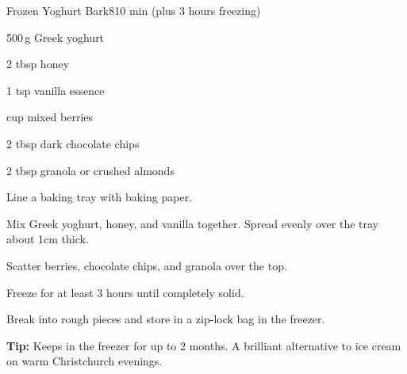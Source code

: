 \begin{recipebox}{Frozen Yoghurt Bark}{8}{10 min (plus 3 hours freezing)}
\begin{ingredients}
  \item 500\,g Greek yoghurt
  \item 2 tbsp honey
  \item 1 tsp vanilla essence
  \item \textonehalf{} cup mixed berries
  \item 2 tbsp dark chocolate chips
  \item 2 tbsp granola or crushed almonds
\end{ingredients}

\begin{method}
  \item Line a baking tray with baking paper.
  \item Mix Greek yoghurt, honey, and vanilla together. Spread evenly over the tray about 1cm thick.
  \item Scatter berries, chocolate chips, and granola over the top.
  \item Freeze for at least 3 hours until completely solid.
  \item Break into rough pieces and store in a zip-lock bag in the freezer.
\end{method}

\begin{notelist}
  \item \textbf{Tip:} Keeps in the freezer for up to 2 months. A brilliant alternative to ice cream on warm Christchurch evenings.
\end{notelist}
\end{recipebox}
